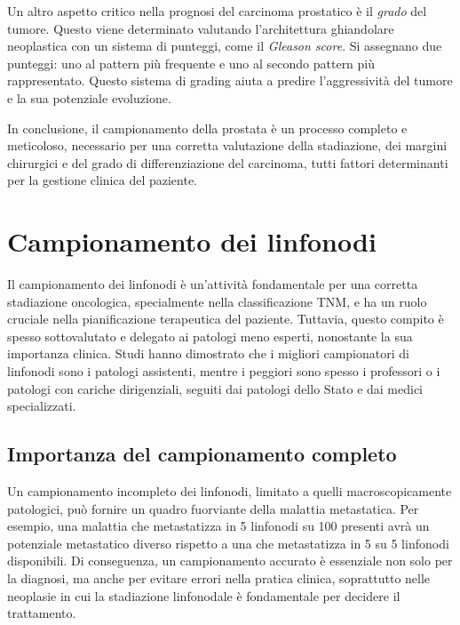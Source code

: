 Un altro aspetto critico nella prognosi del carcinoma prostatico è il \textit{grado} del tumore. Questo viene determinato valutando l'architettura ghiandolare neoplastica con un sistema di punteggi, come il \textit{Gleason score}. Si assegnano due punteggi: uno al pattern più frequente e uno al secondo pattern più rappresentato. Questo sistema di grading aiuta a predire l'aggressività del tumore e la sua potenziale evoluzione.

In conclusione, il campionamento della prostata è un processo completo e meticoloso, necessario per una corretta valutazione della stadiazione, dei margini chirurgici e del grado di differenziazione del carcinoma, tutti fattori determinanti per la gestione clinica del paziente.

\section{Campionamento dei linfonodi}
Il campionamento dei linfonodi è un'attività fondamentale per una corretta stadiazione oncologica, specialmente nella classificazione TNM, e ha un ruolo cruciale nella pianificazione terapeutica del paziente. Tuttavia, questo compito è spesso sottovalutato e delegato ai patologi meno esperti, nonostante la sua importanza clinica. Studi hanno dimostrato che i migliori campionatori di linfonodi sono i patologi assistenti, mentre i peggiori sono spesso i professori o i patologi con cariche dirigenziali, seguiti dai patologi dello Stato e dai medici specializzati.

\subsection{Importanza del campionamento completo}
Un campionamento incompleto dei linfonodi, limitato a quelli macroscopicamente patologici, può fornire un quadro fuorviante della malattia metastatica. Per esempio, una malattia che metastatizza in 5 linfonodi su 100 presenti avrà un potenziale metastatico diverso rispetto a una che metastatizza in 5 su 5 linfonodi disponibili. Di conseguenza, un campionamento accurato è essenziale non solo per la diagnosi, ma anche per evitare errori nella pratica clinica, soprattutto nelle neoplasie in cui la stadiazione linfonodale è fondamentale per decidere il trattamento.

